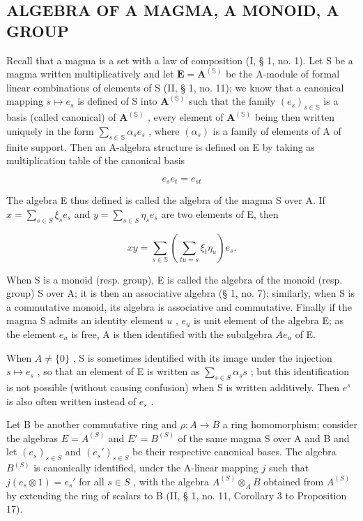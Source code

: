 \subsection{ALGEBRA OF A MAGMA, A MONOID, A GROUP}

Recall that a magma is a set with a law of composition (I, § 1, no. 1). Let S be a magma written multiplicatively and let \(\mathbf{E} = \mathbf{A}^{(\mathbb{S})}\) be the A-module of formal linear combinations of elements of S (II, § 1, no. 11); we know that a canonical mapping \(s \mapsto e_s\) is defined of S into \(\mathbf{A}^{(\mathbb{S})}\) such that the family \((e_s)_{s \in \mathbb{S}}\) is a basis (called canonical) of \(\mathbf{A}^{(\mathbb{S})}\) , every element of \(\mathbf{A}^{(\mathbb{S})}\) being then written uniquely in the form \(\sum_{s \in \mathbb{S}} \alpha_s e_s\) , where \((\alpha_s)\) is a family of elements of A of finite support. Then an A-algebra structure is defined on E by taking as multiplication table of the canonical basis

\[
e _ {s} e _ {t} = e _ {s t}\tag{35}
\]

The algebra E thus defined is called the algebra of the magma S over A. If \(x = \sum_{s \in S} \xi_{s} e_{s}\) and \(y = \sum_{s \in S} \eta_{s} e_{s}\) are two elements of E, then

\[
x y = \sum_ {s \in \mathbb {S}} \left(\sum_ {t u = s} \xi_ {t} \eta_ {u}\right) e _ {s}.
\]

When S is a monoid (resp. group), E is called the algebra of the monoid (resp. group) S over A; it is then an associative algebra (§ 1, no. 7); similarly, when S is a commutative monoid, its algebra is associative and commutative. Finally if the magma S admits an identity element \(u\) , \(e_u\) is unit element of the algebra E; as the element \(e_u\) is free, A is then identified with the subalgebra \(Ae_u\) of E.

When \(A \neq \{0\}\) , S is sometimes identified with its image under the injection \(s \mapsto e_{s}\) , so that an element of E is written as \(\sum_{s \in S} \alpha_{s}s\) ; but this identification is not possible (without causing confusion) when S is written additively. Then \(e^{s}\) is also often written instead of \(e_{s}\) .

Let B be another commutative ring and \(\rho: A \to B\) a ring homomorphism; consider the algebras \(E = A^{(S)}\) and \(E' = B^{(S)}\) of the same magma S over A and B and let \((e_s)_{s \in S}\) and \((e_s')_{s \in S}\) be their respective canonical bases. The algebra \(B^{(S)}\) is canonically identified, under the A-linear mapping \(j\) such that \(j(e_s \otimes 1) = e_s'\) for all \(s \in S\) , with the algebra \(A^{(S)} \otimes_A B\) obtained from \(A^{(S)}\) by extending the ring of scalars to B (II, § 1, no. 11, Corollary 3 to Proposition 17).


